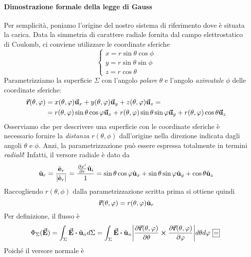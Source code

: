 \paragraph{Dimostrazione formale della legge di Gauss}
\begin{demonstration}
	Per semplicità, poniamo l'origine del nostro sistema di riferimento dove è situata la carica. Data la simmetria di carattere radiale fornita dal campo elettrostatico di Coulomb, ci conviene utilizzare le coordinate sferiche
	\begin{equation*}
		\begin{cases}
			x=r\sin\theta\cos\phi\\
			y=r\sin\theta\sin\phi\\
			z=r\cos\theta
		\end{cases}
	\end{equation*}
	Parametrizziamo la superficie $\Sigma$ con l'angolo \textit{polare} $\theta$ e l'angolo \textit{azimutale} $\phi$ delle coordinate sferiche:
	\begin{align*}
		\vb*{\va{r}}(\theta,\varphi)&=x(\theta,\varphi)\vb*{\va{u}}_x+y(\theta,\varphi)\vb*{\va{u}}_y+z(\theta,\varphi)\vb*{\va{u}}_z=\\
		&=r(\theta,\varphi)\sin\theta\cos\varphi\vb*{\va{u}}_x+r(\theta,\varphi)\sin\theta\sin\varphi\vb*{\va{u}}_y+r(\theta,\varphi)\cos\theta\vb*{\va{u}}_z
	\end{align*}
	Osserviamo che per descrivere una superficie con le coordinate sferiche è necessario fornire la \textit{distanza} $r(\theta,\phi)$ dall'origine nella direzione indicata dagli angoli $\theta$ e $\phi$. Anzi, la parametrizzazione può essere espressa totalmente in termini \textit{radiali}! Infatti, il versore radiale è dato da
	\begin{equation*}
		\hat{\mathbf{u}}_r=\frac{\hat{\mathbf{e}}_r}{\abs{\hat{\mathbf{e}}_r}}=\frac{\pdv{x^i}{r}\hat{\mathbf{u}}_i}{1}=\sin\theta\cos\varphi\hat{\mathbf{u}}_x+\sin\theta\sin\varphi\hat{\mathbf{u}}_y+\cos\theta\hat{\mathbf{u}}_z
	\end{equation*}
	Raccogliendo $r(\theta,\phi)$ dalla parametrizzazione scritta prima si ottiene quindi
	\begin{equation*}
		\vb*{\va{r}}(\theta,\varphi)=r(\theta,\varphi)\hat{\mathbf{u}}_r
	\end{equation*}
	Per definizione, il flusso è
	\begin{equation*}
		\Phi_{\Sigma}(\vba{E})=\int_{\Sigma}\vba{E}\vdot\vbh{u}_nd\Sigma=\int_{\Sigma}\vba{E}\vdot\vbh{u}_n\abs{\pdv{\vba{r}(\theta,\phi)}{\theta}\cross\pdv{\vba{r}(\theta,\phi)}{\phi}}d\theta d\phi\squarequal
	\end{equation*}
	Poiché il versore normale è

\end{demonstration}
